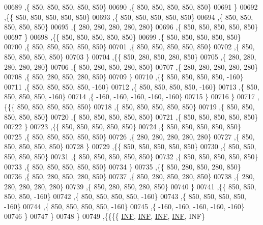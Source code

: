 \begin{DoxyCode}
00689    ,\{   850,   850,   850,   850,   850\}
00690    ,\{   850,   850,   850,   850,   850\}
00691    \}
00692   ,\{\{   850,   850,   850,   850,   850\}
00693    ,\{   850,   850,   850,   850,   850\}
00694    ,\{   850,   850,   850,   850,   850\}
00695    ,\{   280,   280,   280,   280,   280\}
00696    ,\{   850,   850,   850,   850,   850\}
00697    \}
00698   ,\{\{   850,   850,   850,   850,   850\}
00699    ,\{   850,   850,   850,   850,   850\}
00700    ,\{   850,   850,   850,   850,   850\}
00701    ,\{   850,   850,   850,   850,   850\}
00702    ,\{   850,   850,   850,   850,   850\}
00703    \}
00704   ,\{\{   850,   280,   850,   280,   850\}
00705    ,\{   280,   280,   280,   280,   280\}
00706    ,\{   850,   280,   850,   280,   850\}
00707    ,\{   280,   280,   280,   280,   280\}
00708    ,\{   850,   280,   850,   280,   850\}
00709    \}
00710   ,\{\{   850,   850,   850,   850,  -160\}
00711    ,\{   850,   850,   850,   850,  -160\}
00712    ,\{   850,   850,   850,   850,  -160\}
00713    ,\{   850,   850,   850,   850,  -160\}
00714    ,\{  -160,  -160,  -160,  -160,  -160\}
00715    \}
00716   \}
00717  ,\{\{\{   850,   850,   850,   850,   850\}
00718    ,\{   850,   850,   850,   850,   850\}
00719    ,\{   850,   850,   850,   850,   850\}
00720    ,\{   850,   850,   850,   850,   850\}
00721    ,\{   850,   850,   850,   850,   850\}
00722    \}
00723   ,\{\{   850,   850,   850,   850,   850\}
00724    ,\{   850,   850,   850,   850,   850\}
00725    ,\{   850,   850,   850,   850,   850\}
00726    ,\{   280,   280,   280,   280,   280\}
00727    ,\{   850,   850,   850,   850,   850\}
00728    \}
00729   ,\{\{   850,   850,   850,   850,   850\}
00730    ,\{   850,   850,   850,   850,   850\}
00731    ,\{   850,   850,   850,   850,   850\}
00732    ,\{   850,   850,   850,   850,   850\}
00733    ,\{   850,   850,   850,   850,   850\}
00734    \}
00735   ,\{\{   850,   280,   850,   280,   850\}
00736    ,\{   850,   280,   850,   280,   850\}
00737    ,\{   850,   280,   850,   280,   850\}
00738    ,\{   280,   280,   280,   280,   280\}
00739    ,\{   850,   280,   850,   280,   850\}
00740    \}
00741   ,\{\{   850,   850,   850,   850,  -160\}
00742    ,\{   850,   850,   850,   850,  -160\}
00743    ,\{   850,   850,   850,   850,  -160\}
00744    ,\{   850,   850,   850,   850,  -160\}
00745    ,\{  -160,  -160,  -160,  -160,  -160\}
00746    \}
00747   \}
00748  \}
00749 ,\{\{\{\{   \hyperlink{constants_8h_a12c2040f25d8e3a7b9e1c2024c618cb6}{INF},   \hyperlink{constants_8h_a12c2040f25d8e3a7b9e1c2024c618cb6}{INF},   \hyperlink{constants_8h_a12c2040f25d8e3a7b9e1c2024c618cb6}{INF},   \hyperlink{constants_8h_a12c2040f25d8e3a7b9e1c2024c618cb6}{INF},   INF\}

\end{DoxyCode}
